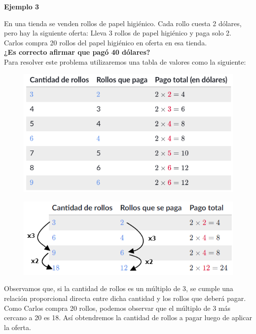 {\color{brown}\textbf{Ejemplo 3}}

En una tienda se venden rollos de papel higiénico. Cada rollo cuesta 2 dólares, pero hay la siguiente oferta:
Lleva 3 rollos de papel higiénico y paga solo 2.
Carlos compra 20 rollos del papel higiénico en oferta en esa tienda.\\
\textbf{¿Es correcto afirmar que pagó 40 dólares?}\\
Para resolver este problema utilizaremos una tabla de valores como la siguiente:

\begin{minipage}{.48\textwidth}
    \begin{figure}[H]
        \centering
        \includegraphics[width=\linewidth]{./Unidad 2/Images/tableS8L102.png}
    \end{figure}
\end{minipage}\hfill
\begin{minipage}{.48\textwidth}
    \begin{figure}[H]
        \centering
        \includegraphics[width=\linewidth]{./Unidad 2/Images/tableS8L101.png}
    \end{figure}
\end{minipage}

Observamos que, si la cantidad de rollos es un múltiplo de 3, se cumple una relación proporcional
directa entre dicha cantidad y los rollos que deberá pagar. Como Carlos compra 20 rollos, podemos
observar que el múltiplo de 3 más cercano a 20 es 18. Así obtendremos la cantidad de rollos a pagar
luego de aplicar la oferta.\\

